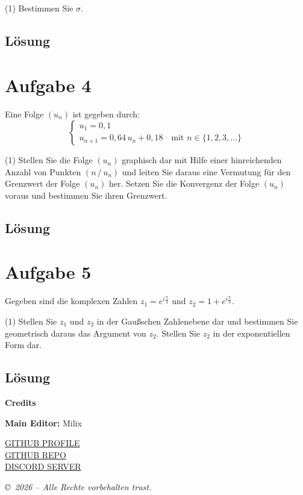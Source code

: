 \documentclass{article}
\begin{document}
\begin{tasks}(1)
    \task[f)] Bestimmen Sie \(\sigma\).
\end{tasks}

\subsection*{Lösung}

\newpage
\section*{Aufgabe 4}

Eine Folge \((u_n)\) ist gegeben durch:
\[
    \begin{cases}
        u_1 = 0{,}1 \\
        u_{n+1} = 0{,}64\, u_n + 0{,}18 \quad \text{mit } n \in \{1, 2, 3, \dots\}
    \end{cases}
\]

\begin{tasks}(1)
    \task Stellen Sie die Folge \((u_n)\) graphisch dar mit Hilfe einer hinreichenden Anzahl von Punkten \((n \,/\, u_n)\) und leiten Sie daraus eine Vermutung für den Grenzwert der Folge \((u_n)\) her.
    \task Setzen Sie die Konvergenz der Folge \((u_n)\) voraus und bestimmen Sie ihren Grenzwert.
\end{tasks}
\subsection*{Lösung}

\newpage
\section*{Aufgabe 5}
Gegeben sind die komplexen Zahlen \(z_1 = e^{i\frac{\pi}{4}}\) und \(z_2 = 1 + e^{i\frac{\pi}{4}}\).

\begin{tasks}(1)
    \task Stellen Sie \(z_1\) und \(z_2\) in der Gaußschen Zahlenebene dar und bestimmen Sie geometrisch daraus das Argument von \(z_2\).
    \task Stellen Sie \(z_2\) in der exponentiellen Form dar.
\end{tasks}
\subsection*{Lösung}

\newpage
\begin{center}
    {\LARGE \textbf{Credits}}
\end{center}
\vspace{1cm}
\noindent\textbf{Main Editor: } Milix
\vspace{0.5cm}
\begin{center}
    \href{https://github.com/Milix244}{GITHUB PROFILE}  \\
    \vspace{0.3cm}
    \href{https://github.com/Milix244/Reserve-BAC-2017}{GITHUB REPO}  \\
    \vspace{0.3cm}
    \href{https://discord.gg/EpQ3eukxJ4}{DISCORD SERVER}
\end{center}
\vspace{1cm}
\textit{\copyright\ 2026 -- Alle Rechte vorbehalten trust.}
\end{document}
